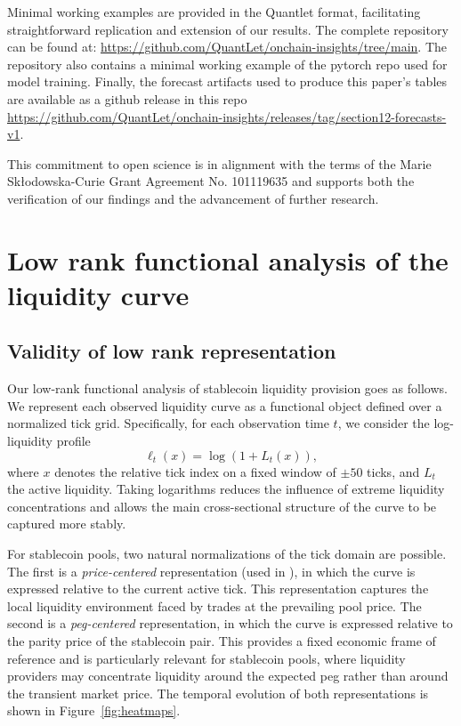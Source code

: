 \documentclass[a4paper,fleqn]{cas-sc}
\begin{document}
Minimal working examples are provided in the Quantlet format, facilitating straightforward replication and extension of our results. The complete repository can be found at: \url{https://github.com/QuantLet/onchain-insights/tree/main}. The repository also contains a minimal working example of the pytorch repo used for model training. Finally, the forecast artifacts used to produce this paper's tables are available as a github release in this repo \url{https://github.com/QuantLet/onchain-insights/releases/tag/section12-forecasts-v1}. 

This commitment to open science is in alignment with the terms of the Marie Skłodowska-Curie Grant Agreement No. 101119635 and supports both the verification of our findings and the advancement of further research.


\printcredits




\newpage
\appendix

\section{Low rank functional analysis of the liquidity curve} \label{sec:liqcurve}

\subsection{Validity of low rank representation}

Our low-rank functional analysis of stablecoin liquidity provision goes as follows. We represent each observed liquidity curve as a functional object defined over a normalized tick grid. Specifically, for each observation time $t$, we consider the log-liquidity profile
\[
    \ell_t(x) = \log (1+L_t(x)),
\]
where $x$ denotes the relative tick index on a fixed window of $\pm 50$ ticks, and $L_t$ the active liquidity. Taking logarithms reduces the influence of extreme liquidity concentrations and allows the main cross-sectional structure of the curve to be captured more stably.

For stablecoin pools, two natural normalizations of the tick domain are possible. The first is a \emph{price-centered} representation (used in \cite{uniswapLPdynamics}), in which the curve is expressed relative to the current active tick. This representation captures the local liquidity environment faced by trades at the prevailing pool price. The second is a \emph{peg-centered} representation, in which the curve is expressed relative to the parity price of the stablecoin pair. This provides a fixed economic frame of reference and is particularly relevant for stablecoin pools, where liquidity providers may concentrate liquidity around the expected peg rather than around the transient market price. The temporal evolution of both representations is shown in Figure~\ref{fig:heatmaps}.
\end{document}
